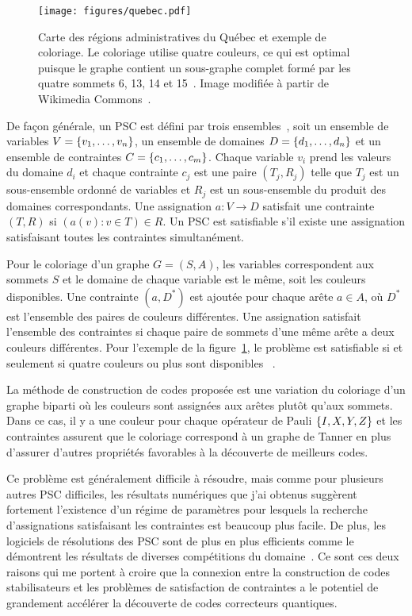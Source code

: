 \begin{figure}
  \begin{center}
    \texttt{[image: figures/quebec.pdf]}
  \end{center}
  \caption[Exemple du problème de coloriage d'une carte]{
    Carte des régions administratives du Québec et exemple de coloriage. 
    Le coloriage utilise quatre couleurs,
    ce qui est optimal puisque le graphe contient un sous-graphe complet
    formé par les quatre sommets 6, 13, 14 et 15~\cite{kubale_graph_2004}.
    Image modifiée à partir de Wikimedia Commons~\cite{noauthor_carte_2016}.
  }
  \label{fig:quebec}
\end{figure}

De façon générale,
un PSC est défini par trois ensembles~\cite{lecoutre_constraint_2009},
soit un ensemble de variables $V = \qty{v_1, \ldots, v_n}$,
un ensemble de domaines $D = \qty{d_1, \ldots, d_n}$
et un ensemble de contraintes $C = \qty{c_1, \ldots, c_m}$.
Chaque variable $v_i$ prend les valeurs du domaine $d_i$
et chaque contrainte $c_j$ est une paire $(T_j, R_j)$
telle que $T_j$ est un sous-ensemble ordonné de variables et $R_j$
est un sous-ensemble du produit des domaines correspondants.
Une assignation $a: V \to D$ satisfait une contrainte $(T, R)$ 
si $(a(v) : v \in T) \in R$.
Un PSC est satisfiable s'il existe une assignation 
satisfaisant toutes les contraintes simultanément.

Pour le coloriage d'un graphe $G = (S, A)$,
les variables correspondent aux sommets $S$
et le domaine de chaque variable est le même,
soit les couleurs disponibles.
Une contrainte $(a, D^*)$ est ajoutée pour chaque arête $a \in A$,
où $D^*$ est l'ensemble des paires de couleurs différentes.
Une assignation satisfait l'ensemble des contraintes 
si chaque paire de sommets d'une même arête a deux couleurs différentes.
Pour l'exemple de la figure~\ref{fig:quebec},
le problème est satisfiable si et seulement si quatre couleurs 
ou plus sont disponibles ~\cite{kubale_graph_2004}.

La méthode de construction de codes proposée est une variation 
du coloriage d'un graphe biparti où les couleurs sont assignées aux arêtes plutôt qu'aux sommets.
Dans ce cas, il y a une couleur pour chaque opérateur de Pauli $\qty{I, X, Y, Z}$
et les contraintes assurent que le coloriage correspond à un graphe de Tanner
en plus d'assurer d'autres propriétés favorables à la découverte de meilleurs codes.

Ce problème est généralement difficile à résoudre,
mais comme pour plusieurs autres PSC difficiles,
les résultats numériques que j'ai obtenus suggèrent fortement
l'existence d'un régime de paramètres pour lesquels la recherche d'assignations
satisfaisant les contraintes est beaucoup plus facile.
De plus,
les logiciels de résolutions des PSC sont de plus en plus efficients comme le démontrent les résultats
de diverses compétitions du domaine~\cite{noauthor_minizinc_nodate, noauthor_sat_nodate}.
Ce sont ces deux raisons qui me portent à croire que la connexion entre la construction de 
codes stabilisateurs et les problèmes de satisfaction de contraintes a le potentiel de grandement accélérer la découverte de codes correcteurs quantiques.

